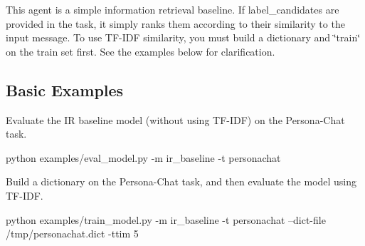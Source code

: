This agent is a simple information retrieval baseline. If {\ttfamily label\+\_\+candidates} are provided in the task, it simply ranks them according to their similarity to the input message. To use T\+F-\/\+I\+DF similarity, you must build a dictionary and \char`\"{}train\char`\"{} on the train set first. See the examples below for clarification.

\subsection*{Basic Examples}

Evaluate the IR baseline model (without using T\+F-\/\+I\+DF) on the Persona-\/\+Chat task. 
\begin{DoxyCode}
python examples/eval\_model.py -m ir\_baseline -t personachat
\end{DoxyCode}


Build a dictionary on the Persona-\/\+Chat task, and then evaluate the model using T\+F-\/\+I\+DF. 
\begin{DoxyCode}
python examples/train\_model.py -m ir\_baseline -t personachat --dict-file /tmp/personachat.dict -ttim 5
\end{DoxyCode}
 